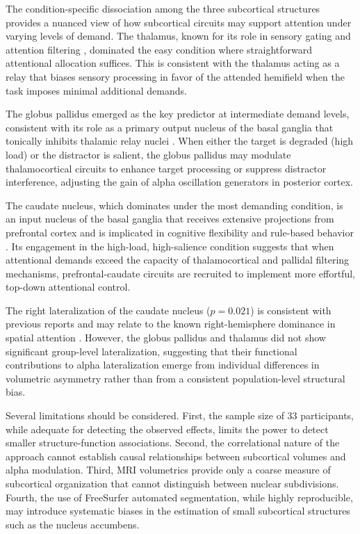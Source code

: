 \documentclass[12pt]{article}
\begin{document}
The condition-specific dissociation among the three subcortical structures provides a nuanced view of how subcortical circuits may support attention under varying levels of demand. The thalamus, known for its role in sensory gating and attention filtering \citep{saalmann2012pulvinar, halassa2014thalamic}, dominated the easy condition where straightforward attentional allocation suffices. This is consistent with the thalamus acting as a relay that biases sensory processing in favor of the attended hemifield when the task imposes minimal additional demands.

The globus pallidus emerged as the key predictor at intermediate demand levels, consistent with its role as a primary output nucleus of the basal ganglia that tonically inhibits thalamic relay nuclei \citep{desimone1995neural}. When either the target is degraded (high load) or the distractor is salient, the globus pallidus may modulate thalamocortical circuits to enhance target processing or suppress distractor interference, adjusting the gain of alpha oscillation generators in posterior cortex.

The caudate nucleus, which dominates under the most demanding condition, is an input nucleus of the basal ganglia that receives extensive projections from prefrontal cortex and is implicated in cognitive flexibility and rule-based behavior \citep{zhong2014causal}. Its engagement in the high-load, high-salience condition suggests that when attentional demands exceed the capacity of thalamocortical and pallidal filtering mechanisms, prefrontal-caudate circuits are recruited to implement more effortful, top-down attentional control.

The right lateralization of the caudate nucleus ($p = 0.021$) is consistent with previous reports and may relate to the known right-hemisphere dominance in spatial attention \citep{corbetta2002control}. However, the globus pallidus and thalamus did not show significant group-level lateralization, suggesting that their functional contributions to alpha lateralization emerge from individual differences in volumetric asymmetry rather than from a consistent population-level structural bias.

Several limitations should be considered. First, the sample size of 33 participants, while adequate for detecting the observed effects, limits the power to detect smaller structure-function associations. Second, the correlational nature of the approach cannot establish causal relationships between subcortical volumes and alpha modulation. Third, MRI volumetrics provide only a coarse measure of subcortical organization that cannot distinguish between nuclear subdivisions. Fourth, the use of FreeSurfer automated segmentation, while highly reproducible, may introduce systematic biases in the estimation of small subcortical structures such as the nucleus accumbens.
\end{document}
